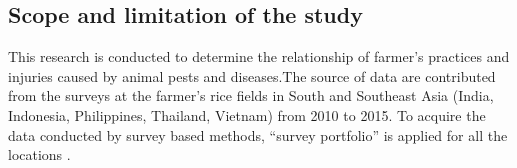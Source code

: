 \subsection{Scope and limitation of the study}

This research is conducted to determine the relationship of farmer's practices and injuries caused by animal pests and diseases.The source of data are contributed from the surveys at the farmer's rice fields in South and Southeast Asia (India, Indonesia, Philippines, Thailand, Vietnam) from 2010 to 2015. To acquire the data conducted by survey based methods, ``survey portfolio'' is applied for all the locations \citep{Savarysurvey2009}.

